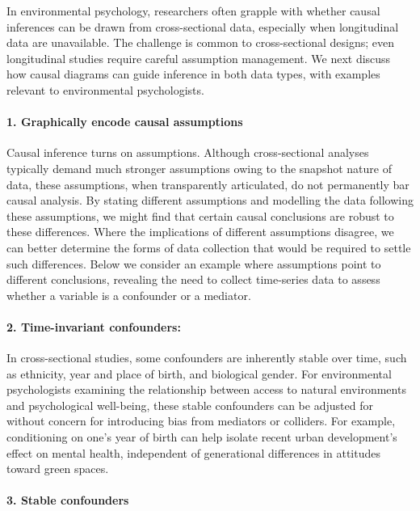 \documentclass[
  singlecolumn]{article}
\let\oldparagraph\paragraph
\renewcommand{\paragraph}[1]{\oldparagraph{#1}\mbox{}}
\begin{document}
In environmental psychology, researchers often grapple with whether
causal inferences can be drawn from cross-sectional data, especially
when longitudinal data are unavailable. The challenge is common to
cross-sectional designs; even longitudinal studies require careful
assumption management. We next discuss how causal diagrams can guide
inference in both data types, with examples relevant to environmental
psychologists.

\paragraph{\texorpdfstring{1. \textbf{Graphically encode causal
assumptions}}{1. Graphically encode causal assumptions}}\label{graphically-encode-causal-assumptions}

Causal inference turns on assumptions. Although cross-sectional analyses
typically demand much stronger assumptions owing to the snapshot nature
of data, these assumptions, when transparently articulated, do not
permanently bar causal analysis. By stating different assumptions and
modelling the data following these assumptions, we might find that
certain causal conclusions are robust to these differences. Where the
implications of different assumptions disagree, we can better determine
the forms of data collection that would be required to settle such
differences. Below we consider an example where assumptions point to
different conclusions, revealing the need to collect time-series data to
assess whether a variable is a confounder or a mediator.

\paragraph{\texorpdfstring{2. \textbf{Time-invariant
confounders}:}{2. Time-invariant confounders:}}\label{time-invariant-confounders}

In cross-sectional studies, some confounders are inherently stable over
time, such as ethnicity, year and place of birth, and biological gender.
For environmental psychologists examining the relationship between
access to natural environments and psychological well-being, these
stable confounders can be adjusted for without concern for introducing
bias from mediators or colliders. For example, conditioning on one's
year of birth can help isolate recent urban development's effect on
mental health, independent of generational differences in attitudes
toward green spaces.

\paragraph{\texorpdfstring{3. \textbf{Stable
confounders}}{3. Stable confounders}}\label{stable-confounders}
\end{document}
